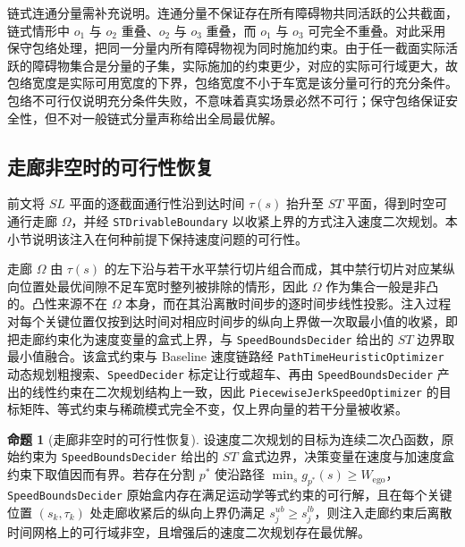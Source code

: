 \documentclass[a4paper,11pt]{ctexart}
\theoremstyle{definition}
\newtheorem{proposition}{命题}[section]
\begin{document}
链式连通分量需补充说明。连通分量不保证存在所有障碍物共同活跃的公共截面，链式情形中 $o_1$ 与 $o_2$ 重叠、$o_2$ 与 $o_3$ 重叠，而 $o_1$ 与 $o_3$ 可完全不重叠。对此采用保守包络处理，把同一分量内所有障碍物视为同时施加约束。由于任一截面实际活跃的障碍物集合是分量的子集，实际施加的约束更少，对应的实际可行域更大，故包络宽度是实际可用宽度的下界，包络宽度不小于车宽是该分量可行的充分条件。包络不可行仅说明充分条件失败，不意味着真实场景必然不可行；保守包络保证安全性，但不对一般链式分量声称给出全局最优解。

\subsection{走廊非空时的可行性恢复}
\label{sec:thy_feasibility}

前文将 $SL$ 平面的逐截面通行性沿到达时间 $\tau(s)$ 抬升至 $ST$ 平面，得到时空可通行走廊 $\Omega$，并经 \texttt{STDrivableBoundary} 以收紧上界的方式注入速度二次规划。本小节说明该注入在何种前提下保持速度问题的可行性。

走廊 $\Omega$ 由 $\tau(s)$ 的左下沿与若干水平禁行切片组合而成，其中禁行切片对应某纵向位置处最优间隙不足车宽时整列被排除的情形，因此 $\Omega$ 作为集合一般是非凸的。凸性来源不在 $\Omega$ 本身，而在其沿离散时间步的逐时间步线性投影。注入过程对每个关键位置仅按到达时间对相应时间步的纵向上界做一次取最小值的收紧，即把走廊约束化为速度变量的盒式上界，与 \texttt{SpeedBoundsDecider} 给出的 $ST$ 边界取最小值融合。该盒式约束与 Baseline 速度链路经 \texttt{PathTimeHeuristicOptimizer} 动态规划粗搜索、\texttt{SpeedDecider} 标定让行或超车、再由 \texttt{SpeedBoundsDecider} 产出的线性约束在二次规划结构上一致，因此 \texttt{PiecewiseJerkSpeedOptimizer} 的目标矩阵、等式约束与稀疏模式完全不变，仅上界向量的若干分量被收紧。

\begin{proposition}[走廊非空时的可行性恢复]
\label{prop:feasibility_recovery}
设速度二次规划的目标为连续二次凸函数，原始约束为 \texttt{SpeedBoundsDecider} 给出的 $ST$ 盒式边界，决策变量在速度与加速度盒约束下取值因而有界。若存在分割 $p^{*}$ 使沿路径 $\min_s g_{p^{*}}(s) \geq W_{\text{ego}}$，\texttt{SpeedBoundsDecider} 原始盒内存在满足运动学等式约束的可行解，且在每个关键位置 $(s_k, \tau_k)$ 处走廊收紧后的纵向上界仍满足 $s_j^{ub} \geq s_j^{lb}$，则注入走廊约束后离散时间网格上的可行域非空，且增强后的速度二次规划存在最优解。
\end{proposition}
\end{document}
